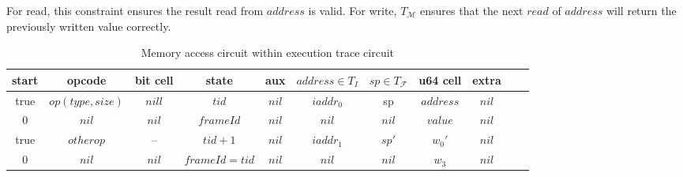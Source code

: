 \begin{remark}
For read, this constraint ensures the result read from $address$ is valid. For write, $T_\mathcal{M}$ ensures that the next $read$ of $address$ will return the previously written value correctly.
\end{remark}
\begin{table}[!h]
\small
\begin{center}
\caption{Memory access circuit within execution trace circuit}
\label{tbl:memory-instruction}
\begin{tabular}{ | c | c | c | c | c | c | c | c | c | c | c | }
  \hline
  start & opcode & bit cell & state & aux & $address \in T_{I}$ & $sp \in T_\mathcal{F}$& u64 cell & extra \\ 
  \hline
   true & $op(type, size)$ & $nill$ & $tid$ & $nil$ & $iaddr_0$ & sp & $address$ & $nil$\\ 
 \hline
   0 & $nil$ & $nil$ & $frameId$ & $nil$ & $nil$ & $nil$ & $value$ & $nil$\\ 
 \hline
   true & $otherop$ & -- & $tid + 1$ & $nil$ & $iaddr_1$ & $sp'$ & $w_0'$ & $nil$\\
 \hline
   0 & $nil$ & $nil$ & $frameId = tid$ & $nil$ & $nil$ & $nil$ & $w_3$ & $nil$\\ 
 \hline
\end{tabular}

\end{center}
\end{table}